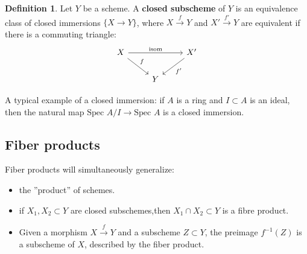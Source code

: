 \documentclass{article}
\theoremstyle{definition}
\newtheorem{defn}{Definition}[section]
\begin{document}
\begin{defn}
    Let $Y$ be a scheme. A \textbf{closed subscheme} of $Y$ is an equivalence class of closed immersions $\{X \to Y\}$, where $X \stackrel{f}{\to}  Y$ and $X' \stackrel{f'}{\to} Y$ are equivalent if there is a commuting triangle:
    \[\begin{tikzcd}
        X & &X' \\
         & Y &
        \arrow["\text{isom}", from=1-1, to=1-3]
        \arrow["f", from=1-1, to=2-2]
        \arrow["f'", from=1-3, to=2-2]
    \end{tikzcd}\]
\end{defn}
A typical example of a closed immersion: if $A$ is a ring and $I \subset A$ is an ideal, then the natural map $\text{Spec }A/I \to \text{Spec }A$ is a closed immersion.

\subsection{Fiber products}
Fiber products will simultaneously generalize:
\begin{itemize}
    \item the ''product'' of schemes.
    \item if $X_1,X_2 \subset Y$ are closed subschemes,then $X_1 \cap X_2 \subset Y$ is a fibre product.
    \item Given a morphism $X \stackrel{f}{\to} Y$ and a subscheme $Z \subset Y$, the preimage $f^{-1}(Z)$ is a subscheme of $X$, described by the fiber product. 
\end{itemize}  
\end{document}
